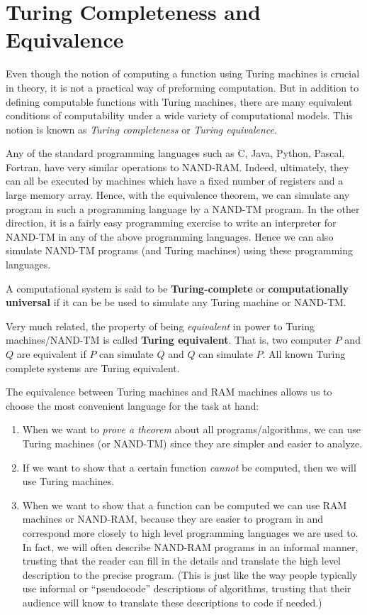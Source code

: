 \section{Turing Completeness and Equivalence}

  Even though the notion of computing a function using Turing machines is crucial in theory, it is not a practical way of preforming computation. But in addition to defining computable functions with Turing machines, there are many equivalent conditions of computability under a wide variety of computational models. This notion is known as \textit{Turing completeness} or \textit{Turing equivalence}. 

  Any of the standard programming languages such as C, Java, Python, Pascal, Fortran, have very similar operations to NAND-RAM. Indeed, ultimately, they can all be executed by machines which have a fixed number of registers and a large memory array. Hence, with the equivalence theorem, we can simulate any program in such a programming language by a NAND-TM program. In the other direction, it is a fairly easy programming exercise to write an interpreter for NAND-TM in any of the above programming languages. Hence we can also simulate NAND-TM programs (and Turing machines) using these programming languages. 

  \begin{definition}
  A computational system is said to be \textbf{Turing-complete} or \textbf{computationally universal} if it can be be used to simulate any Turing machine or NAND-TM. 

  Very much related, the property of being \textit{equivalent} in power to Turing machines/NAND-TM is called \textbf{Turing equivalent}. That is, two computer $P$ and $Q$ are equivalent if $P$ can simulate $Q$ and $Q$ can simulate $P$. All known Turing complete systems are Turing equivalent. 
  \end{definition}

  The equivalence between Turing machines and RAM machines allows us to choose the most convenient language for the task at hand: 
  \begin{enumerate}
      \item When we want to \textit{prove a theorem} about all programs/algorithms, we can use Turing machines (or NAND-TM) since they are simpler and easier to analyze. 
      \item If we want to show that a certain function \textit{cannot} be computed, then we will use Turing machines. 
      \item When we want to show that a function can be computed we can use RAM machines or NAND-RAM, because they are easier to program in and correspond more closely to high level programming languages we are used to. In fact, we will often describe NAND-RAM programs in an informal manner, trusting that the reader can fill in the details and translate the high level description to the precise program. (This is just like the way people typically use informal or “pseudocode” descriptions of algorithms, trusting that their audience will know to translate these descriptions to code if needed.)
  \end{enumerate}


